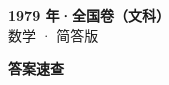 \documentclass[zihao=-4, a4paper]{ctexart}
\begin{document}
\begin{center}
  {\Large\bfseries 1979 年·全国卷（文科）}\\[4pt]
  {\large 数学 · 简答版}
\end{center}
\medskip
{}

\clearpage
{}
\begin{center}{\Large\bfseries 答案速查}\end{center}
\medskip

\end{document}
